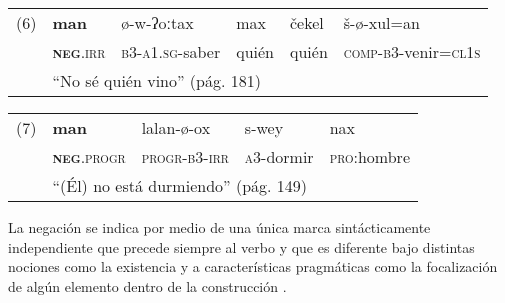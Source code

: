 {%
\noindent \begin{tabular}{llllll}
(6) & \textbf{man} & ø-w-ʔoːtax & max & čekel & š-ø-xul=an \\
& \textsc{\textbf{neg}.irr} & \textsc{b3-a1.sg}-saber & quién & quién & \textsc{comp-b3}-venir=\textsc{cl1s} \\
& \multicolumn{5}{l}{“No sé quién vino” (pág. 181)}                       
\end{tabular} \vspace{0.20cm}

\noindent \begin{tabular}{lllll}
(7) & \textbf{man} & lalan-ø-ox & s-wey & nax \\
& \textsc{\textbf{neg}.progr} & \textsc{progr-b3-irr} & \textsc{a3}-dormir & \textsc{pro}:hombre \\
& \multicolumn{4}{l}{“(Él) no está durmiendo” (pág. 149)}        
\end{tabular} \vspace{0.5cm}

} 

La negación se indica por medio de una única marca sintácticamente independiente que precede siempre al verbo y que es diferente bajo distintas nociones como la existencia y a características pragmáticas como la focalización de algún elemento dentro de la construcción \textcolor{MidnightBlue}{\citep{acateco}}.